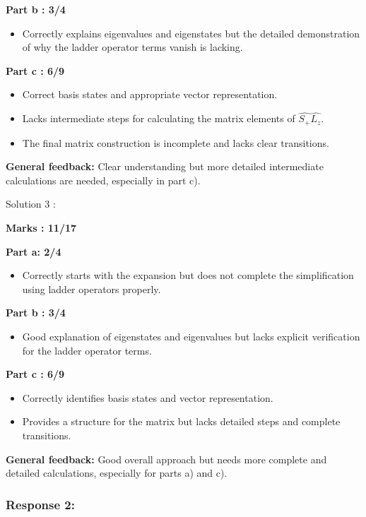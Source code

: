 \documentclass[a4paper,11pt]{article}
\begin{document}
\textbf{Part b : 3/4}
\begin{itemize}
    \item Correctly explains eigenvalues and eigenstates but the detailed demonstration of why the ladder operator terms vanish is lacking.
\end{itemize}

\textbf{Part c : 6/9}
\begin{itemize}
    \item Correct basis states and appropriate vector representation.
    \item Lacks intermediate steps for calculating the matrix elements of $\hat{S_+}\hat{L_z}$.
    \item The final matrix construction is incomplete and lacks clear transitions.
\end{itemize}

\textbf{General feedback:}
Clear understanding but more detailed intermediate calculations are needed, especially in part c).


Solution 3 :

\textbf{Marks : 11/17}

\textbf{Part a: 2/4}
\begin{itemize}
    \item Correctly starts with the expansion but does not complete the simplification using ladder operators properly.
\end{itemize}

\textbf{Part b : 3/4}
\begin{itemize}
    \item Good explanation of eigenstates and eigenvalues but lacks explicit verification for the ladder operator terms.
\end{itemize}

\textbf{Part c : 6/9}
\begin{itemize}
    \item Correctly identifies basis states and vector representation.
    \item Provides a structure for the matrix but lacks detailed steps and complete transitions.
\end{itemize}

\textbf{General feedback:}
Good overall approach but needs more complete and detailed calculations, especially for parts a) and c).


\subsubsection*{Response 2:}
\end{document}
